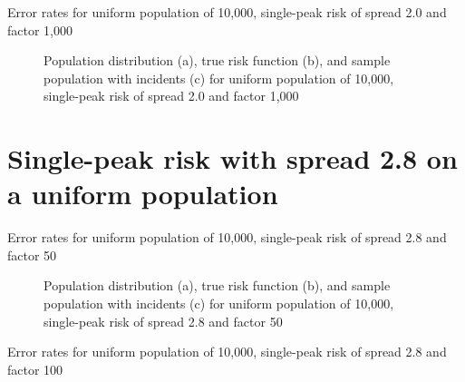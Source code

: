{%

\begin{table}[H]

\caption[]{Error rates for uniform population of 10,000, single-peak risk of \gls{spread} 2.0 and \gls{factor} 1,000}
\label{tab:mean_error_rates:unif_1000_2.0_1h}
\end{table}

\begin{figure}[H]
    
    \caption[]{Population distribution (a), true risk function (b), and sample population with incidents (c) for uniform population of 10,000, single-peak risk of \gls{spread} 2.0 and \gls{factor} 1,000}
    \label{fig:distributions:unif_1000_2.0_1h}    
\end{figure} \newpage


 
\section{Single-peak risk with spread 2.8 on a uniform population}
\label{sec:app:results_unif_2.8_1h}


\begin{table}[H]
    
    \caption[]{Error rates for uniform population of 10,000, single-peak risk of \gls{spread} 2.8 and \gls{factor} 50}
    \label{tab:mean_error_rates:unif_50_2.8_1h}
\end{table}

\begin{figure}[H]
    
    \caption[]{Population distribution (a), true risk function (b), and sample population with incidents (c) for uniform population of 10,000, single-peak risk of \gls{spread} 2.8 and \gls{factor} 50}
    \label{fig:distributions:unif_50_2.8_1h}    
\end{figure} \newpage



\begin{table}[H]

\caption[]{Error rates for uniform population of 10,000, single-peak risk of \gls{spread} 2.8 and \gls{factor} 100}
\label{tab:mean_error_rates:unif_100_2.8_1h}
\end{table}

}
